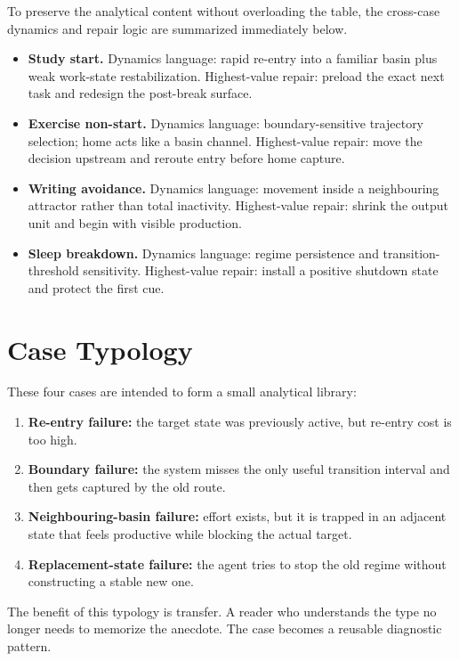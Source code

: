 To preserve the analytical content without overloading the table, the
cross-case dynamics and repair logic are summarized immediately below.

\begin{itemize}[nosep]
  \item \textbf{Study start.} Dynamics language: rapid re-entry into a familiar
        basin plus weak work-state restabilization. Highest-value repair:
        preload the exact next task and redesign the post-break surface.
  \item \textbf{Exercise non-start.} Dynamics language: boundary-sensitive
        trajectory selection; home acts like a basin channel. Highest-value
        repair: move the decision upstream and reroute entry before home
        capture.
  \item \textbf{Writing avoidance.} Dynamics language: movement inside a
        neighbouring attractor rather than total inactivity. Highest-value
        repair: shrink the output unit and begin with visible production.
  \item \textbf{Sleep breakdown.} Dynamics language: regime persistence and
        transition-threshold sensitivity. Highest-value repair: install a
        positive shutdown state and protect the first cue.
\end{itemize}

\section{Case Typology}

These four cases are intended to form a small analytical library:
\begin{enumerate}[nosep]
  \item \textbf{Re-entry failure:} the target state was previously active, but
        re-entry cost is too high.
  \item \textbf{Boundary failure:} the system misses the only useful transition
        interval and then gets captured by the old route.
  \item \textbf{Neighbouring-basin failure:} effort exists, but it is trapped
        in an adjacent state that feels productive while blocking the actual
        target.
  \item \textbf{Replacement-state failure:} the agent tries to stop the old
        regime without constructing a stable new one.
\end{enumerate}

The benefit of this typology is transfer. A reader who understands the type no
longer needs to memorize the anecdote. The case becomes a reusable diagnostic
pattern.

